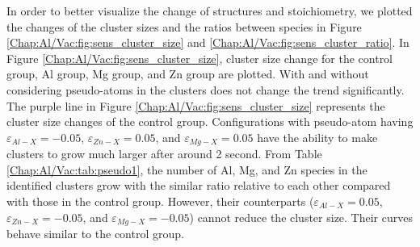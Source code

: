 In order to better visualize the change of structures and stoichiometry, we plotted the changes of the cluster sizes and the ratios between species in Figure \ref{Chap:Al/Vac:fig:sens_cluster_size} and \ref{Chap:Al/Vac:fig:sens_cluster_ratio}. In Figure \ref{Chap:Al/Vac:fig:sens_cluster_size}, cluster size change for the control group, Al group, Mg group, and Zn group are plotted. With and without considering pseudo-atoms in the clusters does not change the trend significantly. The purple line in Figure \ref{Chap:Al/Vac:fig:sens_cluster_size} represents the cluster size changes of the control group. Configurations with pseudo-atom having  $\varepsilon_{Al-X} = -0.05$, $\varepsilon_{Zn-X} = 0.05$, and $\varepsilon_{Mg-X} = 0.05$ have the ability to make clusters to grow much larger after around 2 second.  From Table \ref{Chap:Al/Vac:tab:pseudo1}, the number of Al, Mg, and Zn species in the identified clusters grow with the similar ratio relative to each other compared with those in the control group. However, their counterparts ($\varepsilon_{Al-X} = 0.05$, $\varepsilon_{Zn-X} = -0.05$, and $\varepsilon_{Mg-X} = -0.05$) cannot reduce the cluster size. Their curves behave similar to the control group.


